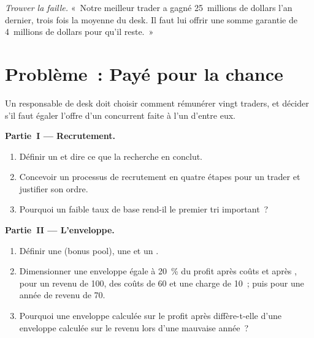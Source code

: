 \begin{exercise}[$\star\star\star$]\label{exo:fm:hiring-and-compensation:8}
\emph{Trouver la faille.} «~Notre meilleur trader a gagné 25~millions de dollars l'an dernier, trois fois la moyenne du desk. Il faut lui offrir une somme garantie de 4~millions de dollars pour qu'il reste.~»
\end{exercise}

\section{Problème~: Payé pour la chance}

\begin{problem}\label{pb:fm:hiring-and-compensation:1}
Un responsable de desk doit choisir comment rémunérer vingt traders, et décider s'il faut égaler l'offre d'un concurrent faite à l'un d'entre eux.

\medskip\noindent\textbf{Partie~I --- Recrutement.}
\begin{enumerate}
\item Définir un  et dire ce que la recherche en conclut.
\item Concevoir un processus de recrutement en quatre étapes pour un trader et justifier son ordre.
\item Pourquoi un faible taux de base rend-il le premier tri important~?
\end{enumerate}

\medskip\noindent\textbf{Partie~II --- L'enveloppe.}
\begin{enumerate}[resume]
\item Définir une  (bonus pool), une  et un .
\item Dimensionner une enveloppe égale à 20~\% du profit après coûts et après , pour un revenu de 100, des coûts de 60 et une charge de 10~; puis pour une année de revenu de 70.
\item Pourquoi une enveloppe calculée sur le profit après  diffère-t-elle d'une enveloppe calculée sur le revenu lors d'une mauvaise année~?
\end{enumerate}


\end{problem}
